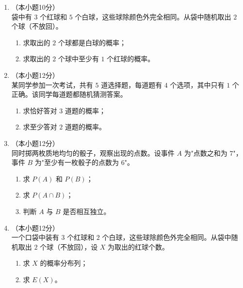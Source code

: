 \documentclass[12pt, a4paper]{ctexart}
\begin{document}
\begin{enumerate}[resume]
\item[17.]（本小题10分）\\
袋中有 $3$ 个红球和 $5$ 个白球，这些球除颜色外完全相同。从袋中随机取出 $2$ 个球（不放回）。
\begin{enumerate}[(1)]
  \item 求取出的 $2$ 个球都是白球的概率；
  \item 求取出的 $2$ 个球中至少有 $1$ 个红球的概率。
\end{enumerate}

\vspace{6cm}

\item[18.]（本小题12分）\\
某同学参加一次考试，共有 $5$ 道选择题，每道题有 $4$ 个选项，其中只有 $1$ 个正确。该同学每道题都随机猜测答案。
\begin{enumerate}[(1)]
  \item 求恰好答对 $3$ 道题的概率；
  \item 求至少答对 $2$ 道题的概率。
\end{enumerate}

\vspace{6cm}

\item[19.]（本小题12分）\\
同时掷两枚质地均匀的骰子，观察出现的点数。设事件 $A$ 为"点数之和为 $7$"，事件 $B$ 为"至少有一枚骰子的点数为 $6$"。
\begin{enumerate}[(1)]
  \item 求 $P(A)$ 和 $P(B)$；
  \item 求 $P(A\cap B)$；
  \item 判断 $A$ 与 $B$ 是否相互独立。
\end{enumerate}

\vspace{6cm}

\item[20.]（本小题12分）\\
一个口袋中装有 $3$ 个红球和 $2$ 个白球，这些球除颜色外完全相同。从袋中随机取出 $2$ 个球（不放回），设 $X$ 为取出的红球个数。
\begin{enumerate}[(1)]
  \item 求 $X$ 的概率分布列；
  \item 求 $E(X)$。
\end{enumerate}

\vspace{6cm}


\end{enumerate}
\end{document}
